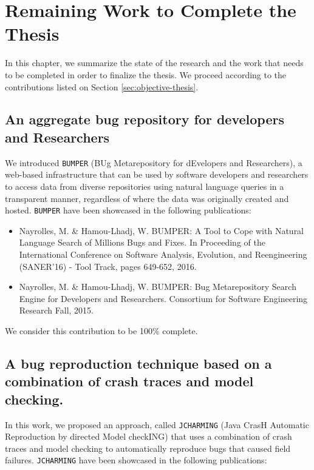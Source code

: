 
\chapter{Remaining Work to Complete the Thesis\label{chap:plan}}

In this chapter, we summarize the state of the research and the work that needs to be completed in order to finalize the thesis.
We proceed according to the contributions listed on Section \ref{sec:objective-thesis}.


\section{An aggregate bug  repository for  developers  and  Researchers}

We introduced {\tt BUMPER} (BUg Metarepository for  dEvelopers  and  Researchers),  a  web-based  infrastructure
that  can  be  used  by  software  developers  and  researchers  to access  data  from  diverse  repositories  using  natural  language queries in a transparent manner, regardless of where the data was originally created and hosted.
{\tt BUMPER} have been showcased in the following publications:

\begin{itemize}
	\item Nayrolles, M. \& Hamou-Lhadj, W. BUMPER: A Tool to Cope with Natural Language Search of Millions Bugs and Fixes. In Proceeding of the International Conference on Software Analysis, Evolution, and Reengineering (SANER'16) - Tool Track, pages 649-652, 2016.
	\item Nayrolles, M. \& Hamou-Lhadj, W. BUMPER: Bug Metarepository Search Engine for Developers and Researchers. Consortium for Software Engineering Research Fall, 2015.
\end{itemize}

We consider this contribution to be 100\% complete.

\section{A bug reproduction technique based on a combination of crash traces and model checking.}

In this work, we proposed an approach, called {\tt JCHARMING} (Java CrasH Automatic Reproduction by directed Model checkING) that uses a combination of crash traces and model checking to automatically reproduce bugs that caused field failures.
{\tt JCHARMING} have been showcased in the following publications:

